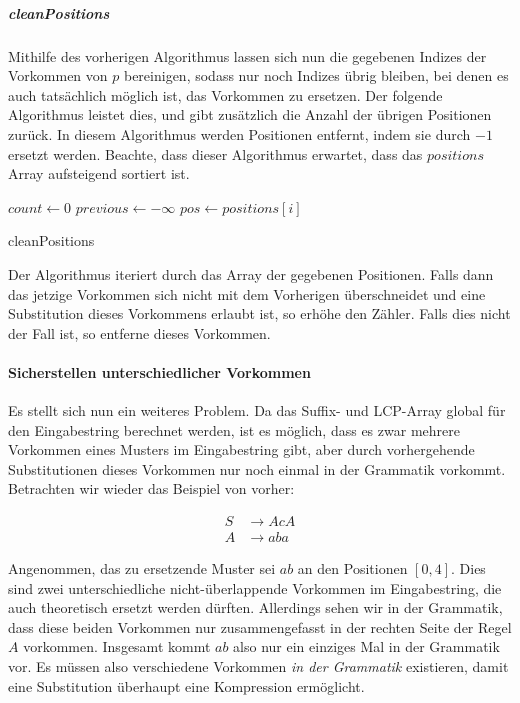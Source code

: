 \subparagraph{cleanPositions}

Mithilfe des vorherigen Algorithmus lassen sich nun die gegebenen Indizes der Vorkommen von $p$ bereinigen, sodass nur noch Indizes übrig bleiben, bei denen es auch tatsächlich möglich ist, das Vorkommen zu ersetzen. Der folgende Algorithmus leistet dies, und gibt zusätzlich die Anzahl der übrigen Positionen zurück. In diesem Algorithmus werden Positionen entfernt, indem sie durch $-1$ ersetzt werden. Beachte, dass dieser Algorithmus erwartet, dass das $positions$ Array aufsteigend sortiert ist.

\begin{algorithm}
    $count \leftarrow 0$\;
    $previous \leftarrow -\infty$\;
     {
        $pos \leftarrow positions[i]$\;
    }
    \caption{cleanPositions}
\end{algorithm}

Der Algorithmus iteriert durch das Array der gegebenen Positionen. Falls dann das jetzige Vorkommen sich nicht mit dem Vorherigen überschneidet und eine Substitution dieses Vorkommens erlaubt ist, so erhöhe den Zähler. Falls dies nicht der Fall ist, so entferne dieses Vorkommen.

\paragraph{Sicherstellen unterschiedlicher Vorkommen}
\label{differingV4}

Es stellt sich nun ein weiteres Problem. Da das Suffix- und LCP-Array global für den Eingabestring berechnet werden, ist es möglich, dass es zwar mehrere Vorkommen eines Musters im Eingabestring gibt, aber durch vorhergehende Substitutionen dieses Vorkommen nur noch einmal in der Grammatik vorkommt. Betrachten wir wieder das Beispiel von vorher:

\begin{align*}
    S &\rightarrow AcA\\
    A &\rightarrow aba
\end{align*}

Angenommen, das zu ersetzende Muster sei $ab$ an den Positionen $[0, 4]$. Dies sind zwei unterschiedliche nicht-überlappende Vorkommen im Eingabestring, die auch theoretisch ersetzt werden dürften. Allerdings sehen wir in der Grammatik, dass diese beiden Vorkommen nur zusammengefasst in der rechten Seite der Regel $A$ vorkommen. Insgesamt kommt $ab$ also nur ein einziges Mal in der Grammatik vor. Es müssen also verschiedene Vorkommen \emph{in der Grammatik} existieren, damit eine Substitution überhaupt eine Kompression ermöglicht.

